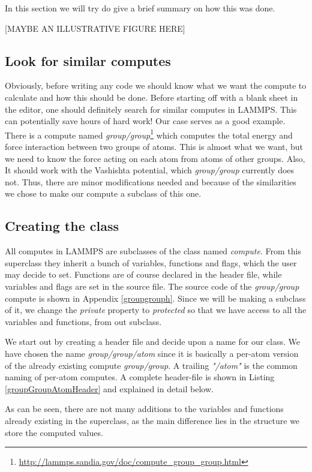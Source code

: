 \documentclass[twoside,english]{uiofysmaster}
\begin{document}
In this section we will try do give a brief summary on how this was done.

{\color{editColor}[MAYBE AN ILLUSTRATIVE FIGURE HERE]}

\subsection{Look for similar computes}
Obviously, before writing any code we should know what we want the compute to calculate and how this should be done. 
Before starting off with a blank sheet in the editor, one should definitely search for similar computes in LAMMPS. This can potentially save hours of hard work!
Our case serves as a good example.
There is a compute named \textit{group/group}\footnote{\href{http://lammps.sandia.gov/doc/compute_group_group.html}{http://lammps.sandia.gov/doc/compute\_group\_group.html}} which computes the total energy and force interaction between two groups of atoms. 
This is almost what we want, but we need to know the force acting on each atom from atoms of other groups. 
Also, It should work with the Vashishta potential, which \textit{group/group} currently does not.
Thus, there are minor modifications needed and because of the similarities we chose to make our compute a subclass of this one.


\subsection{Creating the class}
All computes in LAMMPS are subclasses of the class named  \textit{compute}. 
From this superclass they inherit a bunch of variables, functions and flags, which the user may decide to set. 
Functions are of course declared in the header file, while variables and flags are set in the source file. 
The source code of the \textit{group/group} compute is shown in Appendix \ref{groupgrouph}. 
Since we will be making a subclass of it, we change the \textit{private} property to \textit{protected} so that we have access to all the variables and functions, from out subclass.

We start out by creating a header file and decide upon a name for our class. 
We have chosen the name \textit{group/group/atom} since it is basically a per-atom version of the already existing compute \textit{group/group}. 
A trailing {\it "/atom"} is the common naming of per-atom computes. 
A complete header-file is shown in Listing \ref{groupGroupAtomHeader} and explained in detail below.


As can be seen, there are not many additions to the variables and functions already existing in the superclass, as the main difference lies in the structure we store the computed values.
\end{document}
